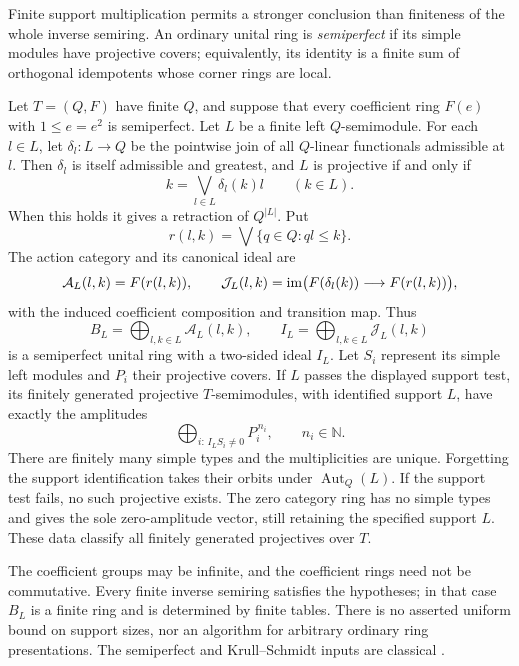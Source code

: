 Finite support multiplication permits a stronger conclusion than
finiteness of the whole inverse semiring. An ordinary unital ring is
\emph{semiperfect} if its simple modules have projective covers;
equivalently, its identity is a finite sum of orthogonal idempotents
whose corner rings are local.
\begin{theorem}\label{thm:finite-inverse-projectives}
Let $T=(Q,F)$ have finite $Q$, and suppose that every coefficient ring
$F(e)$ with $1\leq e=e^2$ is semiperfect. Let $L$ be a finite left
$Q$-semimodule. For each $l\in L$, let $\delta_l:L\to Q$ be the
pointwise join of all $Q$-linear functionals admissible at $l$.
Then $\delta_l$ is itself admissible and greatest, and $L$ is projective
if and only if
\[
 k=\bigvee_{l\in L}\delta_l(k)l\qquad(k\in L).
\]
When this holds it gives a retraction of $Q^{|L|}$. Put
\[
 r(l,k)=\bigvee\{q\in Q:ql\leq k\}.
\]
The action category and its canonical ideal are
\[
 \mathcal A_L(l,k)=F(r(l,k)),\qquad
 \mathcal J_L(l,k)=\operatorname{im}\bigl(F(\delta_l(k))\longrightarrow F(r(l,k))\bigr),
\]
with the induced coefficient composition and transition map. Thus
\[
 B_L=\bigoplus_{l,k\in L}\mathcal A_L(l,k),\qquad
 I_L=\bigoplus_{l,k\in L}\mathcal J_L(l,k)
\]
is a semiperfect unital ring with a two-sided ideal $I_L$.
Let $S_i$ represent its simple left modules and $P_i$ their projective
covers. If $L$ passes the displayed support test, its finitely generated
projective $T$-semimodules, with identified support $L$, have exactly
the amplitudes
\[
 \bigoplus_{i:\,I_LS_i\ne0}P_i^{\,n_i},\qquad n_i\in\mathbb N.
\]
There are finitely many simple types and the multiplicities are unique.
Forgetting the support identification takes their orbits under
$\operatorname{Aut}_Q(L)$. If the support test fails, no such projective
exists. The zero category ring has no simple types and gives the sole
zero-amplitude vector, still retaining the specified support $L$.
These data classify all finitely generated projectives over $T$.
\end{theorem}
The coefficient groups may be infinite, and the coefficient rings need not
be commutative. Every finite
inverse semiring satisfies the hypotheses; in that case $B_L$ is a
finite ring and is determined by finite tables. There is no asserted
uniform bound on support sizes, nor an algorithm for arbitrary ordinary
ring presentations. The semiperfect and Krull--Schmidt inputs are
classical \cite[Proposition~4.1 and Theorem~4.2]{Krause}.
